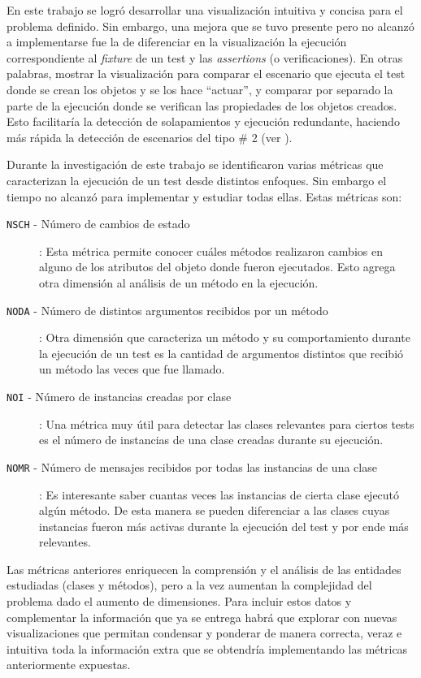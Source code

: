 \par En este trabajo se logró desarrollar una visualización intuitiva y concisa para el problema definido. Sin embargo, una mejora que se tuvo presente pero no alcanzó a implementarse fue la de diferenciar en la visualización la ejecución correspondiente al \emph{fixture} de un test y las \emph{assertions} (o verificaciones). En otras palabras, mostrar la visualización para comparar el escenario que ejecuta el test donde se crean los objetos y se los hace ``actuar'', y comparar por separado la parte de la ejecución donde se verifican las propiedades de los objetos creados. Esto facilitaría la detección de solapamientos y ejecución redundante, haciendo más rápida la detección de escenarios del tipo \# 2 (ver ).

\par Durante la investigación de este trabajo se identificaron varias métricas que caracterizan la ejecución de un test desde distintos enfoques. Sin embargo el tiempo no alcanzó para implementar y estudiar todas ellas. Estas métricas son:

\begin{description}
\item[{\tt NSCH} - Número de cambios de estado]: Esta métrica permite conocer cuáles métodos realizaron cambios en alguno de los atributos del objeto donde fueron ejecutados. Esto agrega otra dimensión al análisis de un método en la ejecución.
\item[{\tt NODA} - Número de distintos argumentos recibidos por un método]: Otra dimensión que caracteriza un método y su comportamiento durante la ejecución de un test es la cantidad de argumentos distintos que recibió un método las veces que fue llamado.
\item[{\tt NOI} - Número de instancias creadas por clase]: Una métrica muy útil para detectar las clases relevantes para ciertos tests es el número de instancias de una clase creadas durante su ejecución. 
\item[{\tt NOMR} - Número de mensajes recibidos por todas las instancias de una clase]: Es interesante saber cuantas veces las instancias de cierta clase ejecutó algún método. De esta manera se pueden diferenciar a las clases cuyas instancias fueron más activas durante la ejecución del test y por ende más relevantes.

\end{description}

\par Las métricas anteriores enriquecen la comprensión y el análisis de las entidades estudiadas (clases y métodos), pero a la vez aumentan la complejidad del problema dado el aumento de dimensiones. Para incluir estos datos y complementar la información que ya se entrega habrá que explorar con nuevas visualizaciones que permitan condensar y ponderar de manera correcta, veraz e intuitiva toda la información extra que se obtendría implementando las métricas anteriormente expuestas.



